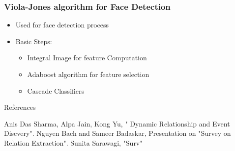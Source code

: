 \documentclass[10pt]{beamer}
\begin{document}
\begin{frame}
\frametitle{Viola-Jones algorithm for Face Detection}
\begin{itemize}
    \item{Used for face detection process}
    \item{Basic Steps:}
    \begin{itemize}
        \item{Integral Image for feature Computation}
        \item{Adaboost algorithm for feature selection}
        \item{Cascade Classifiers}
    \end{itemize}
    
\end{itemize}
\end{frame}





\begin{frame}{References}
  \begin{thebibliography}{99}
Anis Das Sharma, Alpa Jain, Kong Yu, " Dynamic Relationship and Event Discvery".
Nguyen Bach and Sameer Badaskar, Presentation on "Survey on Relation Extraction".
Sunita Sarawagi, "Surv"

\end{thebibliography}
\end{frame}

\begin{frame}
\Large
\begin{center}
\end{center}
\end{frame}
\end{document}
